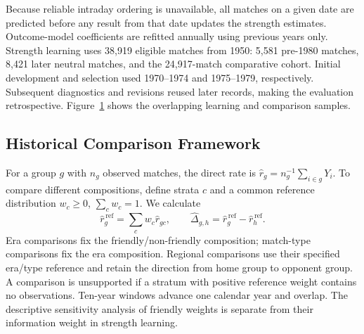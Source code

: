 Because reliable intraday ordering is unavailable, all matches on a given date are predicted before any result from that date updates the strength estimates. Outcome-model coefficients are refitted annually using previous years only. Strength learning uses 38,919 eligible matches from 1950: 5,581 pre-1980 matches, 8,421 later neutral matches, and the 24,917-match comparative cohort. Initial development and selection used 1970--1974 and 1975--1979, respectively. Subsequent diagnostics and revisions reused later records, making the evaluation retrospective. Figure~\ref{fig:study-design} shows the overlapping learning and comparison samples.

\begin{figure}[htbp]
\centering

\label{fig:study-design}
\end{figure}

\subsection{Historical Comparison Framework}
\label{sec:comparison-method}

For a group $g$ with $n_g$ observed matches, the direct rate is $\widehat r_g=n_g^{-1}\sum_{i\in g}Y_i$. To compare different compositions, define strata $c$ and a common reference distribution $w_c\geq0$, $\sum_c w_c=1$. We calculate
\begin{equation}
 \widehat r_g^{\,\mathrm{ref}}=\sum_c w_c\widehat r_{gc},\qquad
 \widehat\Delta_{g,h}=\widehat r_g^{\,\mathrm{ref}}-\widehat r_h^{\,\mathrm{ref}}.
 \label{eq:standardization}
\end{equation}
Era comparisons fix the friendly/non-friendly composition; match-type comparisons fix the era composition. Regional comparisons use their specified era/type reference and retain the direction from home group to opponent group. A comparison is unsupported if a stratum with positive reference weight contains no observations. Ten-year windows advance one calendar year and overlap. The descriptive sensitivity analysis of friendly weights is separate from their information weight in strength learning.


